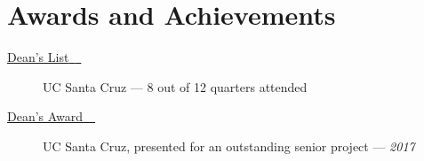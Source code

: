 \documentclass[10pt]{article}
\let\orighref\href
\renewcommand{\href}[2]{\orighref{#1}{#2{\scriptsize~\color{darkgray}\faExternalLink}}}
\begin{document}
\section*{Awards and Achievements}
\begin{description}
  \item[\href{https://honors.ucsc.edu/honors-programs/deans-honors}{Dean's List}] UC Santa Cruz --- 8 out of 12 quarters attended
  \item[\href{https://ua.soe.ucsc.edu/honors/2016-2017}{Dean's Award}] UC Santa
    Cruz, presented for an outstanding senior project --- \textit{2017}
\end{description}
\end{document}
